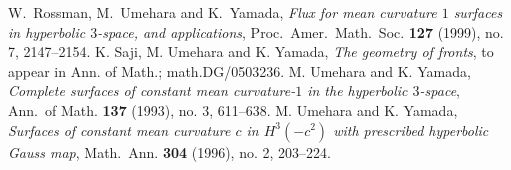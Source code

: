 \documentclass[a4paper]{amsart}
\theoremstyle{plain}
\theoremstyle{remark}
\numberwithin{equation}{section}
\begin{document}
\begin{thebibliography}{KRSUY}
  W.~Rossman, M.~Umehara and K.~Yamada,
  {\itshape Flux for mean curvature $1$ surfaces
    in hyperbolic $3$-space, and applications},
    Proc.~Amer.~Math.~Soc. {\bfseries 127} (1999), no. 7, 2147--2154.
 K. Saji, M. Umehara and K. Yamada,
           {\itshape The geometry of fronts},
           to appear in Ann. of Math.; math.DG/0503236.
  M. Umehara and K. Yamada,
  {\itshape Complete surfaces of constant mean curvature-$1$
            in the hyperbolic $3$-space},
            Ann.\ of Math. {\bfseries 137} (1993), no. 3, 611--638. 
  M. Umehara and K. Yamada,
  {\itshape  Surfaces of constant mean curvature $c$ in 
             $H^3(-c^2)$ with  prescribed hyperbolic Gauss map},
      Math.\ Ann. {\bfseries 304} (1996), no. 2, 203--224.
\end{thebibliography}
\end{document}

